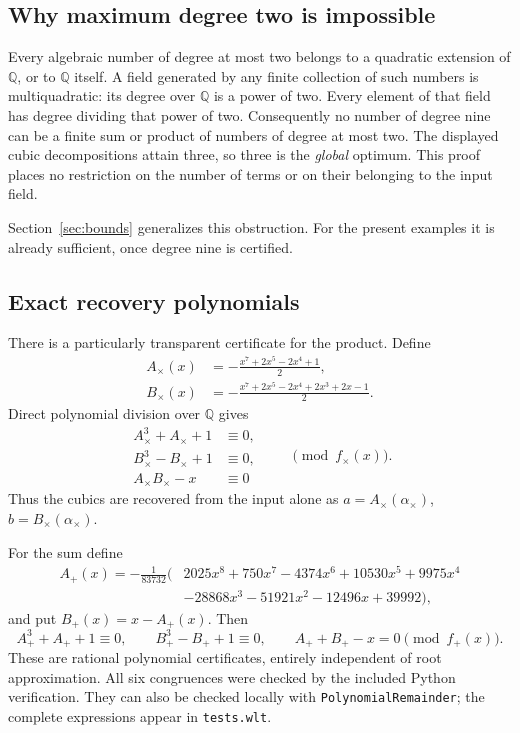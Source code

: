 \documentclass[11pt,letterpaper]{article}
\theoremstyle{definition}
\theoremstyle{remark}
\newcommand{\Q}{\mathbb Q}
\newcommand{\wl}[1]{\texttt{#1}}
\begin{document}
\subsection{Why maximum degree two is impossible}
Every algebraic number of degree at most two belongs to a quadratic extension
of \(\Q\), or to \(\Q\) itself. A field generated by any finite collection
of such numbers is multiquadratic: its degree over \(\Q\) is a power of two.
Every element of that field has degree dividing that power of two.
Consequently no number of degree nine can be a finite sum or product of
numbers of degree at most two. The displayed cubic decompositions attain
three, so three is the \emph{global} optimum. This proof places no restriction
on the number of terms or on their belonging to the input field.

Section~\ref{sec:bounds} generalizes this obstruction. For the present
examples it is already sufficient, once degree nine is certified.

\subsection{Exact recovery polynomials}
There is a particularly transparent certificate for the product. Define
\begin{align}
 A_\times(x)&=-\frac{x^7+2x^5-2x^4+1}{2},\label{eq:Ap}\\
 B_\times(x)&=-\frac{x^7+2x^5-2x^4+2x^3+2x-1}{2}.
\end{align}
Direct polynomial division over \(\Q\) gives
\begin{equation}
\begin{split}
 A_\times^3+A_\times+1&\equiv0,\\
 B_\times^3-B_\times+1&\equiv0,\\
 A_\times B_\times-x&\equiv0
\end{split}\qquad\pmod{f_\times(x)}.\label{eq:pcert}
\end{equation}
Thus the cubics are recovered from the input alone as
\(a=A_\times(\alpha_\times)\),
\(b=B_\times(\alpha_\times)\).

For the sum define
\begin{equation}
\begin{split}
 A_+(x)=-\frac1{83732}\big(&2025x^8+750x^7-4374x^6+10530x^5
 +9975x^4\\[-2pt]
 &-28868x^3-51921x^2-12496x+39992\big),
\end{split}\label{eq:As}
\end{equation}
and put \(B_+(x)=x-A_+(x)\). Then
\begin{equation}
 A_+^3+A_++1\equiv0,\qquad B_+^3-B_++1\equiv0,
 \qquad A_++B_+-x=0\pmod{f_+(x)}.\label{eq:scert}
\end{equation}
These are rational polynomial certificates, entirely independent of root
approximation. All six congruences were checked by the included Python
verification. They can also be checked locally with
\wl{PolynomialRemainder}; the complete expressions appear in
\wl{tests.wlt}.
\end{document}
